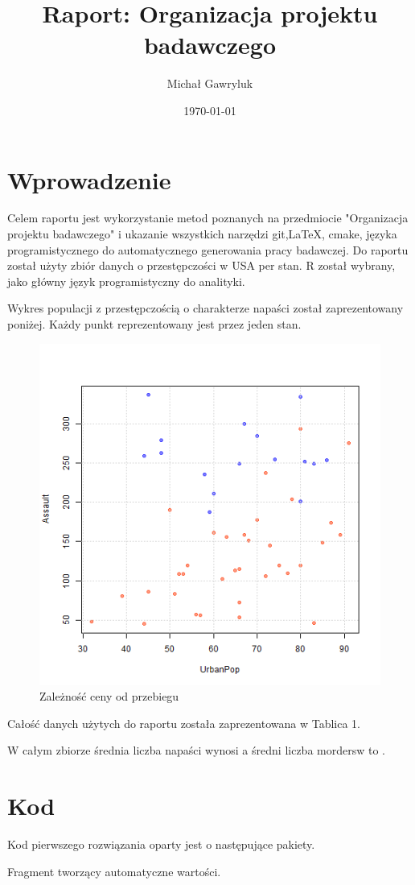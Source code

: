 \documentclass[a4paper]{article}
\begin{document}
\title{Raport: Organizacja projektu badawczego}
\author{Michał Gawryluk}
\date{\today}
\maketitle


\section{Wprowadzenie}

Celem raportu jest wykorzystanie metod poznanych na przedmiocie "Organizacja projektu badawczego" i ukazanie wszystkich narzędzi git,LaTeX, cmake, języka programistycznego do automatycznego generowania pracy badawczej.
Do raportu został użyty zbiór danych o przestępczości w USA per stan. R został wybrany, jako główny język programistyczny do analityki.

Wykres populacji z przestępczością o charakterze napaści został zaprezentowany poniżej. Każdy punkt reprezentowany jest przez jeden stan.

\begin{figure}[hbt]
  \centering
  \includegraphics[width = .65\textwidth]{./analiza/analiza_mg_fig_1}
  \caption{Zależność ceny od przebiegu}
\end{figure}

Całość danych użytych do raportu została zaprezentowana w Tablica 1.



W całym zbiorze średnia liczba napaści wynosi  a średni liczba mordersw to .
 
\pagebreak 
 
\section{Kod}

Kod pierwszego rozwiązania oparty jest o następujące pakiety.



Fragment tworzący automatyczne wartości. 


\end{document}
